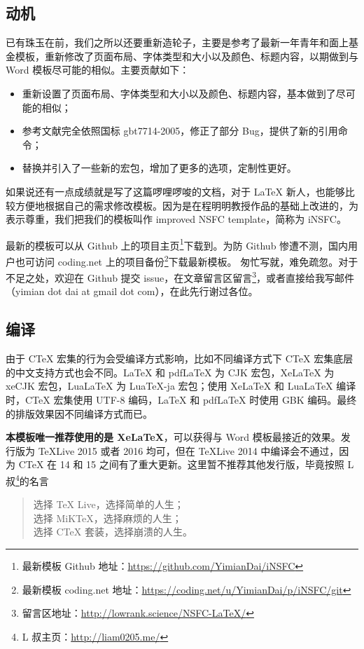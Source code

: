 \documentclass[a4paper,cs4size]{article}
\begin{document}
\subsection{动机}
已有珠玉在前，我们之所以还要重新造轮子，主要是参考了最新一年青年和面上基金模板，重新修改了页面布局、字体类型和大小以及颜色、标题内容，以期做到与 Word 模板尽可能的相似。主要贡献如下：
\begin{itemize}
  \item 重新设置了页面布局、字体类型和大小以及颜色、标题内容，基本做到了尽可能的相似；
  \item 参考文献完全依照国标 gbt7714-2005，修正了部分 Bug，提供了新的引用命令；
  \item 替换并引入了一些新的宏包，增加了更多的选项，定制性更好。
\end{itemize}
如果说还有一点成绩就是写了这篇啰哩啰唆的文档，对于 LaTeX 新人，也能够比较方便地根据自己的需求修改模板。因为是在程明明教授作品的基础上改进的，为表示尊重，我们把我们的模板叫作 improved NSFC template，简称为 iNSFC。

最新的模板可以从 Github 上的项目主页\footnote{最新模板 Github 地址：\href{https://github.com/YimianDai/iNSFC}{https://github.com/YimianDai/iNSFC}}下载到。为防 Github 惨遭不测，国内用户也可访问 coding.net 上的项目备份\footnote{最新模板 coding.net 地址：\href{https://coding.net/u/YimianDai/p/iNSFC/git}{https://coding.net/u/YimianDai/p/iNSFC/git}}下载最新模板。
匆忙写就，难免疏忽。对于不足之处，欢迎在 Github 提交 issue，在文章留言区留言\footnote{留言区地址：\href{http://lowrank.science/NSFC-LaTeX/}{http://lowrank.science/NSFC-LaTeX/}}，或者直接给我写邮件（yimian dot dai at gmail dot com），在此先行谢过各位。



\subsection{编译}
由于 CTeX 宏集的行为会受编译方式影响，比如不同编译方式下 CTeX 宏集底层的中文支持方式也会不同。LaTeX 和 pdfLaTeX 为 CJK 宏包，XeLaTeX 为 xeCJK 宏包，LuaLaTeX 为 LuaTeX-ja 宏包；使用 XeLaTeX 和 LuaLaTeX 编译时，CTeX 宏集使用 UTF-8 编码，LaTeX 和 pdfLaTeX 时使用 GBK 编码。最终的排版效果因不同编译方式而已。

\textbf{本模板唯一推荐使用的是 XeLaTeX}，可以获得与 Word 模板最接近的效果。发行版为 TeXLive 2015 或者 2016 均可，但在 TeXLive 2014 中编译会不通过，因为 CTeX 在 14 和 15 之间有了重大更新。这里暂不推荐其他发行版，毕竟按照 L 叔\footnote{L 叔主页：\href{http://liam0205.me/}{http://liam0205.me/}}的名言
\begin{quote}
  选择 TeX Live，选择简单的人生；\\
  选择 MiKTeX，选择麻烦的人生；\\
  选择 CTeX 套装，选择崩溃的人生。
\end{quote}
\end{document}
